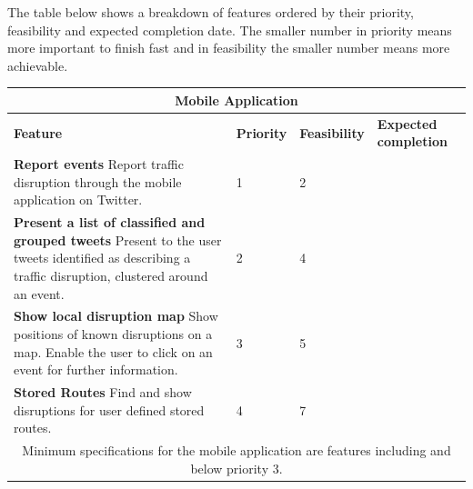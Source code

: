 The table below shows a breakdown of features ordered by their priority, feasibility and expected completion date. The smaller number in priority means more important to finish fast and in feasibility the smaller number means more achievable.

\begin{center}
\begin{tabular}{ | p{8.4cm} | p{1.8cm} | p{1.8cm} | p{2.2cm} | }
\hline
\multicolumn{4}{|c|}{\textbf{Mobile Application}} \\ \hline
\textbf{Feature} & \textbf{Priority} & \textbf{Feasibility} & \textbf{Expected completion} \\ \hline
\textbf{Report events}\newline
Report traffic disruption through the mobile application on Twitter. & 1 & 2 & \\ \hline
\textbf{Present a list of classified and grouped tweets}\newline
Present to the user tweets identified as describing a traffic disruption,
clustered around an event. & 2 & 4 & \\ \hline
\textbf{Show local disruption map}\newline
Show positions of known disruptions on a map. Enable the user to click on an event for further information. & 3 & 5 & \\ \hline
\textbf{Stored Routes}\newline
Find and show disruptions for user defined stored routes. & 4 & 7 & \\ \hline
\multicolumn{4}{|c|}{Minimum specifications for the mobile application are
features including and below priority 3.} \\ \hline
\end{tabular}
\end{center}
